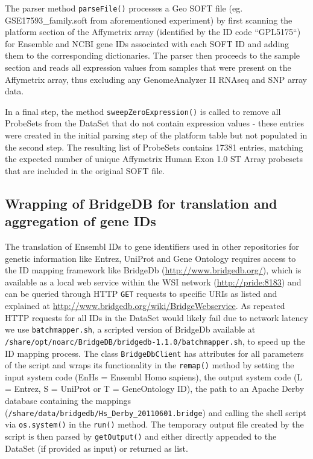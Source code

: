   The parser method \lstinline|parseFile()| processes a Geo SOFT file (eg.
GSE17593\_family.soft from aforementioned experiment) by first scanning the
platform section of the Affymetrix array (identified by the ID code ``GPL5175``)
for Ensemble and NCBI gene IDs associated with each SOFT ID and adding them to
the corresponding dictionaries. The parser then proceeds to the sample section
and reads all expression values from samples that were present on the Affymetrix
array, thus excluding any GenomeAnalyzer II RNAseq and SNP array data.
  
  In a final step, the method \lstinline|sweepZeroExpression()| is called to
remove all ProbeSets from the DataSet that do not contain expression values -
these entries were created in the initial parsing step of the platform table but
not populated in the second step. The resulting list of ProbeSets contains 17381
entries, matching the expected number of unique Affymetrix Human Exon 1.0 ST
Array probesets that are included in the original SOFT file.
  
  \subsection[BridgeDB wrapper]{Wrapping of BridgeDB for translation and aggregation of gene IDs}
  
  The translation of Ensembl IDs to gene identifiers used in other repositories
for genetic information like Entrez, UniProt and Gene Ontology requires access
to the ID mapping framework like BridgeDb (\url{http://www.bridgedb.org/}),
which is available as a local web service within the WSI network
(\url{http://pride:8183}) and can be queried through HTTP \lstinline|GET|
requests to specific URIs as listed and explained at
\url{http://www.bridgedb.org/wiki/BridgeWebservice}. As repeated HTTP requests
for all IDs in the DataSet would likely fail due to network latency we use
\lstinline|batchmapper.sh|, a scripted version of BridgeDb available at
\lstinline|/share/opt/noarc/BridgeDB/bridgedb-1.1.0/batchmapper.sh|, to speed up
the ID mapping process. The class \lstinline|BridgeDbClient| has attributes for
all parameters of the script and wraps its functionality in the
\lstinline|remap()| method by setting the input system code (EnHs = Ensembl Homo
sapiens), the output system code (L = Entrez, S = UniProt or T = GeneOntology
ID), the path to an Apache Derby database containing the mappings
(\lstinline|/share/data/bridgedb/Hs_Derby_20110601.bridge|) and calling the
shell script via \lstinline|os.system()| in the \lstinline|run()| method. The
temporary output file created by the script is then parsed by
\lstinline|getOutput()| and either directly appended to the DataSet (if provided
as input) or returned as list.

